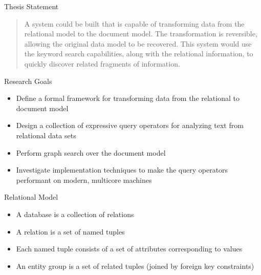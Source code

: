 \documentclass[compress]{beamer}
\begin{document}
	
		\begin{frame}{Thesis Statement}
			\begin{quotation}
				A system could be built that is capable of \alert{transforming data from the relational model to the document model}.  The transformation is \alert{reversible}, allowing the original data model to be recovered.  This system would use the \alert{keyword search} capabilities, along with the \alert{relational information}, to quickly \alert{discover related fragments of information}.
			\end{quotation}
		\end{frame}
		
		\begin{frame}{Research Goals}
			\begin{itemize}
				\item Define a \alert{formal framework} for transforming data from the relational to document model
				\item Design a collection of expressive \alert{query operators} for analyzing text from relational data sets
				\item Perform \alert{graph search} over the document model
				\item Investigate implementation techniques to make the query operators performant on modern, \alert{multicore machines}
			\end{itemize}
		\end{frame}
		
		\begin{frame}{Relational Model}
			\begin{itemize}
				\item A \alert{database} is a collection of relations
				\item A \alert{relation} is a set of named tuples
				\item Each \alert{named tuple} consists of a set of attributes corresponding to values
				\item An \alert{entity group} is a set of related tuples (joined by foreign key constraints)
			\end{itemize}
		\end{frame}
		
\end{document}
